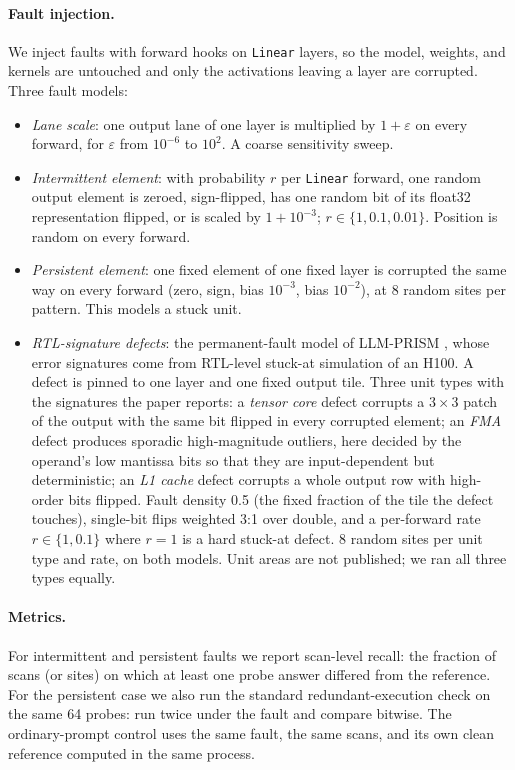 \documentclass[11pt]{article}
\begin{document}
\paragraph{Fault injection.}
We inject faults with forward hooks on \texttt{Linear} layers, so the model, weights, and kernels are untouched and only the activations leaving a layer are corrupted. Three fault models:
\begin{itemize}\itemsep1pt
\item \emph{Lane scale}: one output lane of one layer is multiplied by $1+\varepsilon$ on every forward, for $\varepsilon$ from $10^{-6}$ to $10^{2}$. A coarse sensitivity sweep.
\item \emph{Intermittent element}: with probability $r$ per \texttt{Linear} forward, one random output element is zeroed, sign-flipped, has one random bit of its float32 representation flipped, or is scaled by $1+10^{-3}$; $r\in\{1,0.1,0.01\}$. Position is random on every forward.
\item \emph{Persistent element}: one fixed element of one fixed layer is corrupted the same way on every forward (zero, sign, bias $10^{-3}$, bias $10^{-2}$), at 8 random sites per pattern. This models a stuck unit.
\item \emph{RTL-signature defects}: the permanent-fault model of LLM-PRISM \citep{tyagi2026prism}, whose error signatures come from RTL-level stuck-at simulation of an H100. A defect is pinned to one layer and one fixed output tile. Three unit types with the signatures the paper reports: a \emph{tensor core} defect corrupts a $3\times3$ patch of the output with the same bit flipped in every corrupted element; an \emph{FMA} defect produces sporadic high-magnitude outliers, here decided by the operand's low mantissa bits so that they are input-dependent but deterministic; an \emph{L1 cache} defect corrupts a whole output row with high-order bits flipped. Fault density 0.5 (the fixed fraction of the tile the defect touches), single-bit flips weighted 3:1 over double, and a per-forward rate $r\in\{1,0.1\}$ where $r=1$ is a hard stuck-at defect. 8 random sites per unit type and rate, on both models. Unit areas are not published; we ran all three types equally.
\end{itemize}

\paragraph{Metrics.}
For intermittent and persistent faults we report scan-level recall: the fraction of scans (or sites) on which at least one probe answer differed from the reference. For the persistent case we also run the standard redundant-execution check on the same 64 probes: run twice under the fault and compare bitwise. The ordinary-prompt control uses the same fault, the same scans, and its own clean reference computed in the same process.
\end{document}
